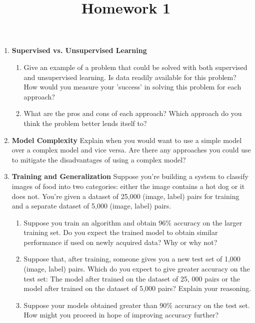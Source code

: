 \documentclass{article}
\begin{document}
\title{Homework 1}
\maketitle
\thispagestyle{fancy}

\begin{enumerate}[1)]
	\item \textbf{Supervised vs. Unsupervised Learning}
		\begin{enumerate}[1.]
			\item Give an example of a problem that could be solved with both supervised and unsupervised learning. Is data readily available for this problem? How would you measure your 'success' in solving this problem for each approach?

			\item What are the pros and cons of each approach? Which approach do you think the problem better lends itself to?
				
		\end{enumerate}

	\item \textbf{Model Complexity} Explain when you would want to use a simple model over a complex model and vice versa. Are there any approaches you could use to mitigate the disadvantages of using a complex model?

	\item \textbf{Training and Generalization} Suppose you're building a system to classify images of food into two categories: either the image contains a hot dog or it does not. You're given a dataset of 25,000 (image, label) pairs for training and a separate dataset of 5,000 (image, label) pairs.
		\begin{enumerate}[1.]
			\item Suppose you train an algorithm and obtain 96\% accuracy on the larger training set. Do you expect the trained model to obtain similar performance if used on newly acquired data? Why or why not?

			\item Suppose that, after training, someone gives you a new test set of 1,000 (image, label) pairs. Which do you expect to give greater accuracy on the test set: The model after trained on the dataset of 25, 000 pairs or the model after trained on the dataset of 5,000 pairs? Explain your reasoning.

			\item Suppose your models obtained greater than 90\% accuracy on the test set. How might you proceed in hope of improving accuracy further?


\end{enumerate}
\end{enumerate}
\end{document}
